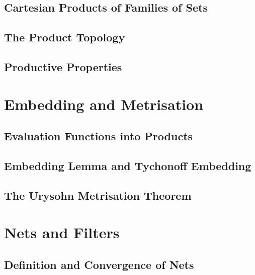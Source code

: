 \section{Cartesian Products of Families of Sets}
\section{The Product Topology}
\section{Productive Properties}

\chapter{Embedding and Metrisation}
\section{Evaluation Functions into Products}
\section{Embedding Lemma and Tychonoff Embedding}
\section{The Urysohn Metrisation Theorem}

\chapter{Nets and Filters}
\section{Definition and Convergence of Nets}


